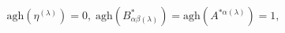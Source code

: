 \begin{equation}
\mathrm{agh}\left( \eta ^{(\lambda )}\right) =0,\;\mathrm{agh}\left(
B_{\alpha \beta (\lambda )}^{*}\right) =\mathrm{agh}\left( A^{*\alpha
(\lambda )}\right) =1,  \label{cin8}
\end{equation}

